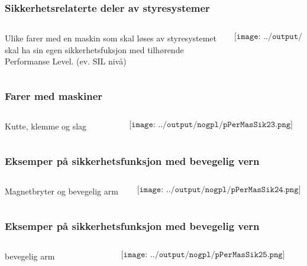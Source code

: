 \documentclass[aspectratio=169,xcolor=dvipsnames]{beamer}
\begin{document}
\begin{frame}
	\frametitle{Sikkerhetsrelaterte deler av styresystemer}
	\begin{columns}
		\begin{column}{0.5\textwidth}
			Ulike farer med en maskin som skal løses av styresystemet skal ha sin egen sikkerhetsfuksjon med tilhørende Performanse Level. (ev. SIL nivå)
			
		\end{column}

		\begin{column}{0.5\textwidth}
	$$\texttt{[image: ../output/nogpl/pPerMasSik22.png]}$$
		\end{column}
	\end{columns}
\end{frame}

\begin{frame}
	\frametitle{Farer med maskiner}
	\begin{columns}
		\begin{column}{0.5\textwidth}
Kutte, klemme og slag
			
		\end{column}

		\begin{column}{0.5\textwidth}
	$$\texttt{[image: ../output/nogpl/pPerMasSik23.png]}$$
		\end{column}
	\end{columns}
\end{frame}

\begin{frame}
	\frametitle{Eksemper på sikkerhetsfunksjon med bevegelig vern}
	\begin{columns}
		\begin{column}{0.5\textwidth}

Magnetbryter og bevegelig arm
			
		\end{column}

		\begin{column}{0.5\textwidth}
	$$\texttt{[image: ../output/nogpl/pPerMasSik24.png]}$$
		\end{column}
	\end{columns}
\end{frame}

\begin{frame}
	\frametitle{Eksemper på sikkerhetsfunksjon med bevegelig vern}
	\begin{columns}
		\begin{column}{0.5\textwidth}
bevegelig arm
			
		\end{column}

		\begin{column}{0.5\textwidth}
	$$\texttt{[image: ../output/nogpl/pPerMasSik25.png]}$$
		\end{column}
	\end{columns}
\end{frame}
\end{document}
